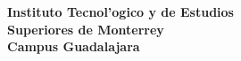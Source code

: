 \begin{center}
\textbf{Instituto Tecnol'ogico y de Estudios\\Superiores de Monterrey}\\
\LARGE
\textbf{Campus Guadalajara}\\
\vspace{10 pt}


\end{center}
